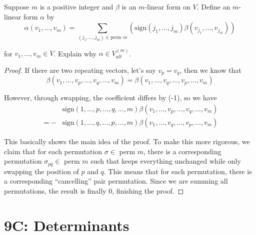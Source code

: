 \documentclass{extarticle}
\begin{document}
\begin{problem}{5}
    Suppose \(m\) is a positive integer and \(\beta\) is an \(m\)-linear form on \(V\). Define an 
    \(m\)-linear form \(\alpha\) by 
    \[\alpha(v_1, \ldots, v_m) = \sum_{(j_1, \ldots, j_m) \in \text{perm } m} 
    \left( \text{sign} \left( j_1, \ldots, j_m \right) \beta(v_{j_1}, \ldots, v_{j_m}) \right)\]

    for \(v_1, \ldots, v_m \in V\). Explain why \(\alpha \in V_{alt}^{(m)}\).
\end{problem}

\begin{proof}
If there are two repeating vectors, let's say \(v_p = v_q\), then we know that 
\[\beta(v_1, \ldots, v_p, \ldots, v_q, \ldots, v_m) = \beta(v_1, \ldots, v_q, \ldots, v_p, \ldots, v_m)\]

However, through swapping, the coefficient differs by (-1), so we have 
\begin{align*}
    &\text{sign}(1, \ldots, p, \ldots, q, \ldots, m) \beta(v_1, \ldots, v_p, \ldots, v_q, \ldots, v_m) \\
= - &\text{sign}(1, \ldots, q, \ldots, p, \ldots, m) \beta(v_1, \ldots, v_q, \ldots, v_p, \ldots, v_m)
\end{align*}


This basically shows the main idea of the proof. To make this more rigorous, we claim that 
for each permutation \(\sigma \in\) perm \(m\), there is a corresponding permutation 
\(\sigma_{pq} \in\) perm \(m\) such that keeps everything unchanged while only swapping the position of 
\(p\) and \(q\). This means that for each permutation, there is a corresponding ``cancelling'' pair 
permutation. Since we are summing all permutations, the result is finally 0, finishing the proof.
\end{proof}


\newpage 
\section*{9C: Determinants}
\end{document}
